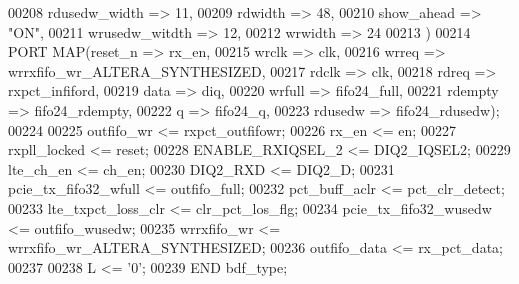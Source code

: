 \begin{DoxyCode}
00208             rdusedw_width => \textcolor{vhdllogic}{11},
00209             rdwidth => \textcolor{vhdllogic}{48},
00210             show_ahead => \textcolor{keyword}{"ON"},
00211             wrusedw_witdth => \textcolor{vhdllogic}{12},
00212             wrwidth => \textcolor{vhdllogic}{24}
00213             \textcolor{vhdlchar}{)}
00214 \textcolor{keywordflow}{PORT} \textcolor{keywordflow}{MAP}(reset_n => rx_en,
00215          wrclk => clk,
00216          wrreq => wrrxfifo_wr_ALTERA_SYNTHESIZED,
00217          rdclk => clk,
00218          rdreq => rxpct_infiford,
00219          data => diq,
00220          wrfull => fifo24_full,
00221          rdempty => fifo24_rdempty,
00222          q => fifo24_q,
00223          rdusedw => fifo24_rdusedw\textcolor{vhdlchar}{)};
00224 
00225 \textcolor{vhdlchar}{outfifo_wr} \textcolor{vhdlchar}{<=} \textcolor{vhdlchar}{rxpct_outfifowr};
00226 \textcolor{vhdlchar}{rx_en} \textcolor{vhdlchar}{<=} \textcolor{vhdlchar}{en};
00227 \textcolor{vhdlchar}{rxpll_locked} \textcolor{vhdlchar}{<=} \textcolor{vhdlchar}{reset};
00228 ENABLE\_RXIQSEL\_2 <= DIQ2\_IQSEL2;
00229 \textcolor{vhdlchar}{lte_ch_en} \textcolor{vhdlchar}{<=} \textcolor{vhdlchar}{ch_en};
00230 \textcolor{vhdlchar}{DIQ2_RXD} \textcolor{vhdlchar}{<=} \textcolor{vhdlchar}{DIQ2_D};
00231 \textcolor{vhdlchar}{pcie_tx_fifo32_wfull} \textcolor{vhdlchar}{<=} \textcolor{vhdlchar}{outfifo_full};
00232 \textcolor{vhdlchar}{pct_buff_aclr} \textcolor{vhdlchar}{<=} \textcolor{vhdlchar}{pct_clr_detect};
00233 \textcolor{vhdlchar}{lte_txpct_loss_clr} \textcolor{vhdlchar}{<=} \textcolor{vhdlchar}{clr_pct_los_flg};
00234 \textcolor{vhdlchar}{pcie_tx_fifo32_wusedw} \textcolor{vhdlchar}{<=} \textcolor{vhdlchar}{outfifo_wusedw};
00235 \textcolor{vhdlchar}{wrrxfifo_wr} \textcolor{vhdlchar}{<=} \textcolor{vhdlchar}{wrrxfifo_wr_ALTERA_SYNTHESIZED};
00236 \textcolor{vhdlchar}{outfifo_data} \textcolor{vhdlchar}{<=} \textcolor{vhdlchar}{rx_pct_data};
00237 
00238 \textcolor{vhdlchar}{L} \textcolor{vhdlchar}{<=} \textcolor{vhdlchar}{'}\textcolor{vhdllogic}{}\textcolor{vhdllogic}{0}\textcolor{vhdlchar}{'};
00239 \textcolor{keywordflow}{END} \textcolor{vhdlchar}{bdf\_type};
\end{DoxyCode}
